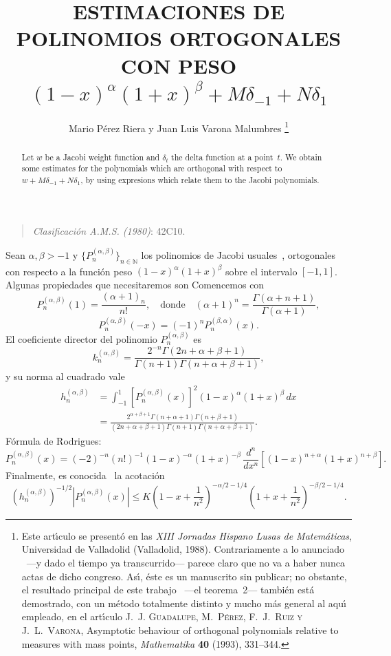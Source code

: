 \documentclass[a4paper]{article}
\date{}
\title{ESTIMACIONES DE POLINOMIOS ORTOGONALES CON PESO
$(1-x)^{\alpha} (1+x)^{\beta} + M\delta_{-1} + N\delta_{1}$}
\author{Mario P\'erez Riera y Juan Luis Varona Malumbres%
\renewcommand\thefootnote{}
\renewcommand\footnotemark{}
\footnote{
Este art\'{\i}culo se present\'o en las
\textit{XIII Jornadas Hispano Lusas de Matem\'aticas}, 
Universidad de Valladolid (Valladolid, 1988).
Contrariamente a lo anunciado ~---y dado el tiempo ya transcurrido---
parece claro que no va a haber nunca actas de dicho congreso.
As\'{\i}, \'este es un manuscrito sin publicar; no obstante,
el resultado principal de este trabajo ~---el teorema~2---
tambi\'en est\'a demostrado, con un m\'etodo totalmente distinto
y mucho m\'as general al aqu\'{\i} empleado,
en el art\'{\i}culo
\textsc{J.~J. Guadalupe, M.~P\'erez, F.~J.~Ruiz y J.~L.~Varona},
{Asymptotic behaviour of orthogonal polynomials relative to
measures with mass points},
\textit{Mathematika}
\textbf{40} (1993), 331--344.
}
}
\newcommand{\N}{\mathbb{N}}
\begin{document}

\maketitle


\begin{abstract}\noindent
Let $w$ be a Jacobi weight function and $\delta_{t}$ the 
delta function at a point~$t$. We obtain some estimates for the 
polynomials which are orthogonal with respect to $w + M \delta_{-1} 
+ N \delta_{1}$, by using expresions which relate them to the 
Jacobi polynomials.
\end{abstract}

\begin{quote}
\textit{Clasificaci\'on A.M.S. (1980)}: 42C10.
\end{quote}
\bigskip

Sean $\alpha, \beta > -1$ y $\{P^{(\alpha,\beta)}_{n}\}_{n \in \N}$
los polinomios de Jacobi usuales~\cite{Sz}, ortogonales con respecto 
a la funci\'{o}n peso $(1-x)^{\alpha}(1+x)^{\beta}$ sobre el 
intervalo $[-1,1]$. Algunas propiedades que necesitaremos son
Comencemos con
$$
P^{(\alpha,\beta)}_{n}(1) = \frac{(\alpha+1)_{n}}{n!} ,
\quad\text{donde}\quad
(\alpha+1)^{n} = \frac{\Gamma(\alpha+n+1)}{\Gamma(\alpha+1)},
$$
$$
P^{(\alpha,\beta)}_{n}(-x) = (-1)^{n}P^{(\beta,\alpha)}_{n}(x).
$$
El coeficiente director del polinomio $P^{(\alpha,\beta)}_{n}$ es
$$
k^{(\alpha,\beta)}_{n} = \frac{2^{-n} \Gamma(2n+\alpha+\beta+1)}{\Gamma(n+1)\Gamma(n+\alpha+\beta+1)},
$$
y su norma al cuadrado vale
\begin{align*}
h^{(\alpha,\beta)}_{n} &= \int_{-1}^{1} [P^{(\alpha,\beta)}_{n}(x)]^{2} 
(1-x)^{\alpha}(1+x)^{\beta} \,dx \\
&= \frac{2^{\alpha+\beta+1}\Gamma(n+\alpha+1)\Gamma(n+\beta+1)}
  {(2n+\alpha+\beta+1)\Gamma(n+1)\Gamma(n+\alpha+\beta+1)}.
\end{align*}
F\'{o}rmula de Rodrigues:
$$
P^{(\alpha,\beta)}_{n}(x) 
= (-2)^{-n}(n!)^{-1} (1-x)^{-\alpha}(1+x)^{-\beta} \, \frac{d^{n}}{dx^{n}} 
[(1-x)^{n+\alpha}(1+x)^{n+\beta}].
$$
Finalmente, es conocida~\cite{Mu} la acotaci\'{o}n
$$
(h^{(\alpha,\beta)}_{n})^{-1/2} |P^{(\alpha,\beta)}_{n}(x)| 
\leq K \left(1-x + \frac{1}{n^{2}} \right)^{-\alpha/2-1/4}
\left(1+x + \frac{1}{n^{2}} \right)^{-\beta/2-1/4}.
$$
\end{document}

